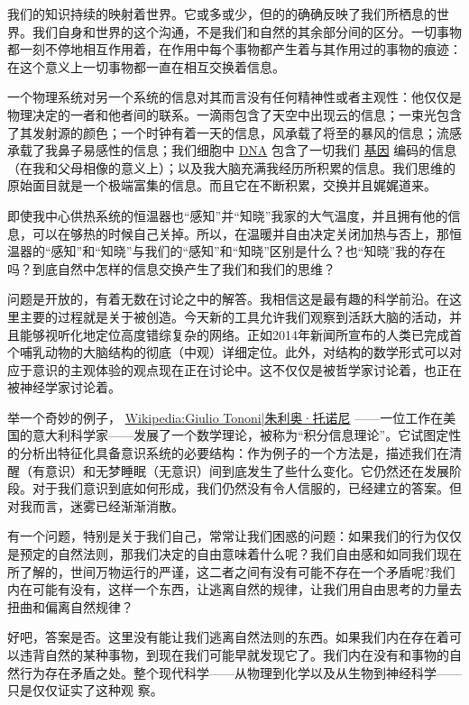     我们的知识持续的映射着世界。它或多或少，但的的确确反映了我们所栖息的世界。我们自身和世界的这个沟通，不是我们和自然的其余部分间的区分。一切事物都一刻不停地相互作用着，在作用中每个事物都产生着与其作用过的事物的痕迹：在这个意义上一切事物都一直在相互交换着信息。

    一个物理系统对另一个系统的信息对其而言没有任何精神性或者主观性：他仅仅是物理决定的一者和他者间的联系。一滴雨包含了天空中出现云的信息；一束光包含了其发射源的颜色；一个时钟有着一天的信息，风承载了将至的暴风的信息；流感承载了我鼻子易感性的信息；我们细胞中
\href{http://toyhouse.cc/wiki/index.php/DNA}{DNA}
包含了一切我们
\href{http://toyhouse.cc/wiki/index.php/基因}{基因}
编码的信息（在我和父母相像的意义上）；以及我大脑充满我经历所积累的信息。我们思维的原始面目就是一个极端富集的信息。而且它在不断积累，交换并且娓娓道来。
 
   即使我中心供热系统的恒温器也“感知”并“知晓”我家的大气温度，并且拥有他的信息，可以在够热的时候自己关掉。所以，在温暖并自由决定关闭加热与否上，那恒温器的“感知”和“知晓”与我们的“感知”和“知晓”区别是什么？也“知晓”我的存在吗？到底自然中怎样的信息交换产生了我们和我们的思维？

    问题是开放的，有着无数在讨论之中的解答。我相信这是最有趣的科学前沿。在这里主要的过程就是关于被创造。今天新的工具允许我们观察到活跃大脑的活动，并且能够视听化地定位高度错综复杂的网络。正如2014年新闻所宣布的人类已完成首个哺乳动物的大脑结构的彻底（中观）详细定位。此外，对结构的数学形式可以对应于意识的主观体验的观点现在正在讨论中。这不仅仅是被哲学家讨论着，也正在被神经学家讨论着。

    举一个奇妙的例子，
\href{http://toyhouse.cc/wiki/index.php/Wikipedia:Giulio Tononi|朱利奥·托诺尼}{Wikipedia:Giulio Tononi|朱利奥·托诺尼}
——一位工作在美国的意大利科学家——发展了一个数学理论，被称为“积分信息理论”。它试图定性的分析出特征化具备意识系统的必要结构：作为例子的一个方法是，描述我们在清醒（有意识）和无梦睡眠（无意识）间到底发生了些什么变化。它仍然还在发展阶段。对于我们意识到底如何形成，我们仍然没有令人信服的，已经建立的答案。但对我而言，迷雾已经渐渐消散。

    有一个问题，特别是关于我们自己，常常让我们困惑的问题：如果我们的行为仅仅是预定的自然法则，那我们决定的自由意味着什么呢？我们自由感和如同我们现在所了解的，世间万物运行的严谨，这二者之间有没有可能不存在一个矛盾呢?我们内在可能有没有，这样一个东西，让逃离自然的规律，让我们用自由思考的力量去扭曲和偏离自然规律？

    好吧，答案是否。这里没有能让我们逃离自然法则的东西。如果我们内在存在着可以违背自然的某种事物，到现在我们可能早就发现它了。我们内在没有和事物的自然行为存在矛盾之处。整个现代科学——从物理到化学以及从生物到神经科学——只是仅仅证实了这种观
察。
 
